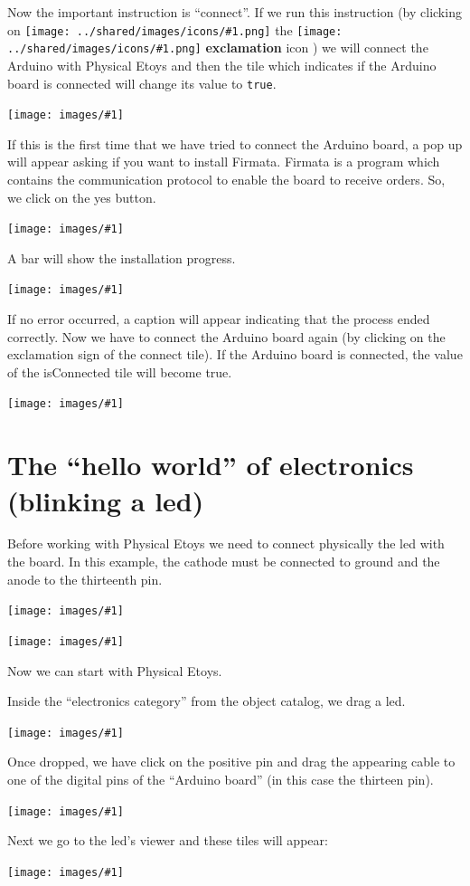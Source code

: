\documentclass[a4paper,12pt]{article}
\newcommand{\screenshot}[1]
{
\begin{center}
	\texttt{[image: images/\#1]}
\end{center}
}
\newcommand{\code}[1]{\texttt{#1}}
\newcommand{\important}[1]{\textbf{#1}}
\newcommand{\inserticon}[1]
{
\texttt{[image: ../shared/images/icons/\#1.png]}
}
\newcommand{\icon}[2][]
{
\ifthenelse {\equal{#1} {}} {\inserticon{#2}} {the \inserticon{#2} \important{#1} icon}
}
\begin{document}
Now the important instruction is “connect”. If we run this instruction (by
clicking on \icon[exclamation]{exclamation}) we will connect the Arduino with
Physical Etoys and then the tile which indicates if the Arduino board is
connected will change its value to \code{true}. 

\screenshot{10.png}

If this is the first time that we have tried to connect the Arduino board, a
pop up will appear asking if you want to install Firmata. Firmata is a program
which contains the communication protocol to enable the board to receive
orders. So, we click on the yes button. 

\screenshot{11.png}


A bar will show the installation progress.
 
\screenshot{12.png}

If no error occurred, a caption will appear indicating that the process ended
correctly. Now we have to connect the Arduino board again (by clicking on the
exclamation sign of the connect tile). If the Arduino board is connected, the
value of the isConnected tile will become true. 

\screenshot{13.png}

\section{The “hello world” of electronics (blinking a led)}

Before working with Physical Etoys we need to connect physically the led with
the board. In this example, the cathode must be connected to ground and the
anode to the thirteenth pin. 

\screenshot{14.jpg}

\screenshot{15.png}

Now we can start with Physical Etoys. 

Inside the “electronics category” from the object catalog, we drag a led. 

\screenshot{16.png}

Once dropped, we have click on the positive pin and drag the appearing cable to
one of the digital pins of the “Arduino board” (in this case the thirteen pin). 

\screenshot{17.png}

Next we go to the led’s viewer and these tiles will appear:

\screenshot{18.png}
\end{document}
